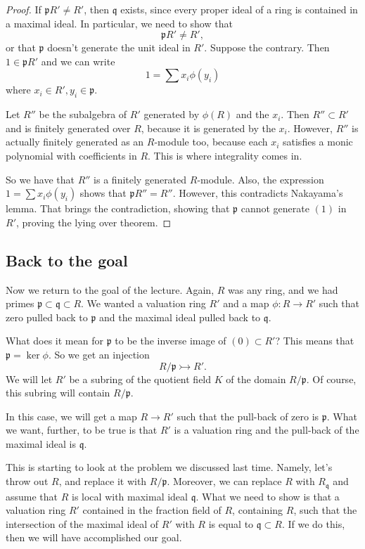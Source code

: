 \begin{proof}
If $\mathfrak{p}R' \neq R'$, then
$\mathfrak{q}$ exists, since every proper ideal of a ring is contained in a
maximal ideal. In particular, we need to show that
\[ \mathfrak{p} R' \neq R', \]
or that $\mathfrak{p}$ doesn't generate the unit ideal in $R'$. Suppose the
contrary. Then $1 \in \mathfrak{p}R'$ and we can write
\[ 1 = \sum x_i \phi(y_i)  \]
where $x_i \in R', y_i \in \mathfrak{p}$. 

Let $R''$ be the subalgebra of $R'$ generated by $\phi(R)$ and the $x_i$. Then
$R'' \subset R'$ and is finitely generated over $R$, because it is generated by
the $x_i$. However, $R''$ is actually finitely generated as an $R$-module too,
because each $x_i$ satisfies a monic polynomial with coefficients in $R$. This
is where integrality comes in.

So we have that $R''$ is a finitely generated $R$-module. Also, the expression
$1 = \sum x_i \phi(y_i)$ shows that $\mathfrak{p}R'' = R''$. However, this
contradicts Nakayama's lemma. That brings the contradiction, showing that
$\mathfrak{p}$ cannot generate $(1)$ in $R'$, proving the lying over theorem. 

\end{proof} 

\subsection{Back to the goal} Now we return to the goal of the  lecture. Again, $R$
was any ring, and we had primes $\mathfrak{p} \subset \mathfrak{q} \subset R$. We
wanted a valuation ring $R'$ and a map $\phi: R \to R'$ such that zero pulled
back to $\mathfrak{p}$ and the maximal ideal pulled back to $\mathfrak{q}$.

What does it mean for $\mathfrak{p}$ to be the inverse image of $(0) \subset
R'$? This means that $\mathfrak{p} = \ker \phi$. So we get an injection 
\[ R/\mathfrak{p} \rightarrowtail R'.  \]
We will let $R'$ be a subring of the quotient field $K$ of the domain
$R/\mathfrak{p}$. Of course, this subring will contain $R/\mathfrak{p}$. 

In this case, we will get  a map $R \to R'$ such that the pull-back of zero is
$\mathfrak{p}$.  What we want, further, to be true is that $R'$ is a valuation
ring and the pull-back of the maximal ideal is $\mathfrak{q}$. 



This is starting to look at the problem we discussed last time.
Namely, let's throw out $R$, and replace it with  $R/\mathfrak{p}$.  
Moreover, we can replace $R$ with $R_{\mathfrak{q}}$ and assume that $R$ is
local with maximal ideal $\mathfrak{q}$.
What we need to show is that a valuation ring $R' $ contained in the fraction
field of $R$, containing $R$, such that the intersection of the maximal ideal of
$R'$ with $R$ is equal to $\mathfrak{q} \subset R$.
If we do this, then we will have accomplished our goal.  

